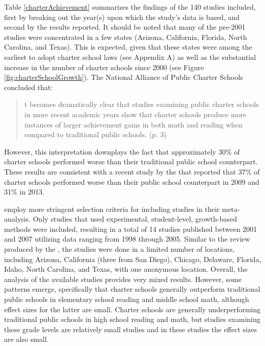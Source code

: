 \documentclass[letterpaper,12p,twoside]{article} %
\renewcommand{\normalsize}{\fontsize{12}{13}\selectfont}
\begin{document}
Table \ref{charterAchievement} summarizes the findings of the 140 studies included, first by breaking out the year(s) upon which the study's data is based, and second by the results reported. It should be noted that many of the pre-2001 studies were concentrated in a few states (Arizona, California, Florida, North Carolina, and Texas). This is expected, given that these states were among the earliest to adopt charter school laws (see Appendix A) as well as the substantial increase in the number of charter schools since 2000 (see Figure \ref{fig:charterSchoolGrowth}). The National Alliance of Public Charter Schools concluded that:

\begin{quote} \normalsize
[I]t becomes dramatically clear that studies examining public charter schools in more recent academic years show that charter schools produce more instances of larger achievement gains in both math and reading when compared to traditional public schools. (p. 3)
\end{quote}

\noindent However, this interpretation downplays the fact that approximately 30\% of charter schools performed worse than their traditional public school counterpart. These results are consistent with a recent study by the  that reported that 37\% of charter schools performed worse than their public school counterpart in 2009 and 31\% in 2013.



 employ more stringent selection criteria for including studies in their meta-analysis. Only studies that used experimental, student-level, growth-based methods were included, resulting in a total of 14 studies published between 2001 and 2007 utilizing data ranging from 1998 through 2005. Similar to the review produced by the , the studies were done in a limited number of locations, including Arizona, California (three from San Diego), Chicago, Delaware, Florida, Idaho, North Carolina, and Texas, with one anonymous location. Overall, the analysis of the available studies provides very mixed results. However, some patterns emerge, specifically that charter schools generally outperform traditional public schools in elementary school reading and middle school math, although effect sizes for the latter are small. Charter schools are generally underperforming traditional public schools in high school reading and math, but studies examining these grade levels are relatively small studies \cite<see also,>{whatweknow} and in these studies the effect sizes are also small.
\end{document}
